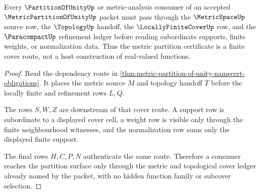 \begin{theorem}
\label{thm:metric-partition-of-unity-cover-route}
Every $\PartitionOfUnityUp$ or metric-analysis consumer of an accepted $\MetricPartitionOfUnityUp$ packet must pass through the $\MetricSpaceUp$ source row, the $\TopologyUp$ handoff, the $\LocallyFiniteCoverUp$ row, and the $\ParacompactUp$ refinement ledger before reading subordinate supports, finite weights, or normalization data. Thus the metric partition certificate is a finite cover route, not a host construction of real-valued functions.
\end{theorem}
\begin{proof}
Read the dependency route in \autoref{thm:metric-partition-of-unity-namecert-obligations}. It places the metric source $M$ and topology handoff $T$ before the locally finite and refinement rows $L,Q$.

The rows $S,W,Z$ are downstream of that cover route. A support row is subordinate to a displayed cover cell, a weight row is visible only through the finite neighbourhood witnesses, and the normalization row sums only the displayed finite support.

The final rows $H,C,P,N$ authenticate the same route. Therefore a consumer reaches the partition surface only through the metric and topological cover ledger already named by the packet, with no hidden function family or subcover selection.
\end{proof}




